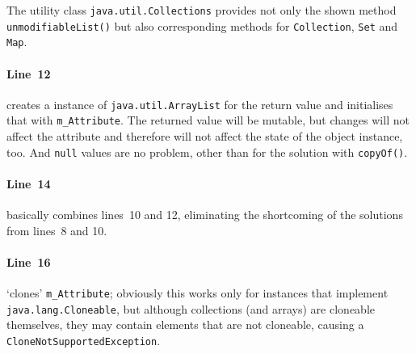 The utility class \lstinline|java.util.Collections|\autocite{ORACLE_DOC_COLLECTIONS_CLASS} provides not only the shown method \lstinline|unmodifiableList()|\autocite{ORACLE_DOC_COLLECTIONS:unmodifiableList} but also corresponding methods for \lstinline|Collection|\autocite{ORACLE_DOC_COLLECTIONS:unmodifiableCollection}, \lstinline|Set|\autocite{ORACLE_DOC_COLLECTIONS:unmodifiableSet} and \lstinline|Map|\autocite{ORACLE_DOC_COLLECTIONS:unmodifiableMap}. 

\paragraph{Line~12} creates a instance of \lstinline|java.util.ArrayList|\autocite{ORACLE_DOC_ARRAYLIST_CLASS} for the return value and initialises that with \lstinline|m_Attribute|. The returned value will be mutable, but changes will not affect the attribute and therefore will not affect the state of the object instance, too. And \lstinline|null| values are no problem, other than for the solution with \lstinline|copyOf()|.

\paragraph{Line~14} basically combines lines~10 and 12, eliminating the shortcoming of the solutions from lines~8 and 10.

\paragraph{Line~16} ‘clones’ \lstinline|m_Attribute|; obviously this works only for instances that implement \lstinline|java.lang.Cloneable|\autocite{ORACLE_DOC_CLONEABLE_INTERFACE}, but although collections (and arrays) are cloneable themselves, they may contain elements that are not cloneable, causing a \lstinline|CloneNotSupportedException|\autocite{ORACLE_DOC_CLONENOTSUPPORTEDEXCEPTION_CLASS}.\\[1\baselineskip]

